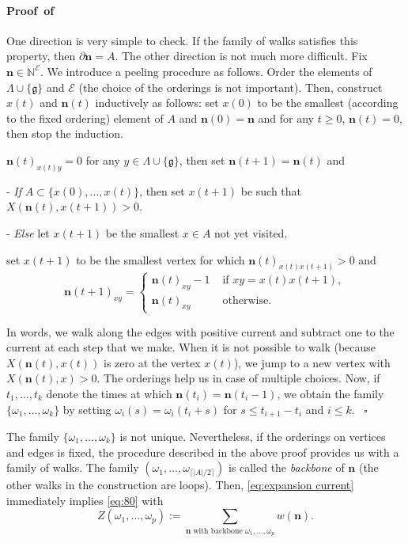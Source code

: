 \documentclass[a4paper,oneside,11pt]{article}
\newenvironment{proof}[1][\relax]%
  {\paragraph{Proof\ifx#1\relax\else~of #1\fi}}%
  {~\hfill$\square$\par\bigskip}
\newcommand{\ee}{\end{equation}}
\newcommand{\be}{\begin{equation}}
\begin{document}
\begin{proof}
One direction is very simple to check. If the family of walks satisfies this property, then $\partial \mathbf n=A$. The other direction is not much more difficult. Fix $\mathbf n\in \mathbb N^{\mathcal E}$. We introduce a peeling procedure as follows. Order the elements of $\Lambda\cup\{\mathfrak g\}$ and $\mathcal E$ (the choice of the orderings is not important). Then, construct $x(t)$ and $\mathbf n(t)$ inductively as follows: set $x(0)$ to be the smallest (according to the fixed ordering) element of $A$ and $\mathbf n(0)=\mathbf n$ and for any $t\ge0$,
\medbreak
{} $\mathbf n(t)=0$, then stop the induction.
 
  $\mathbf n(t)_{x(t)y}=0$ for any $y\in\Lambda\cup\{\mathfrak g\}$, then set $\mathbf n(t+1)=\mathbf n(t)$ and

- {\em If} $A\subset\{x(0),\dots,x(t)\}$, then set $x(t+1)$ be such that $X(\mathbf n(t),x(t+1))>0$.

- {\em Else} let $x(t+1)$ be the smallest $x\in A$ not yet visited.

 set $x(t+1)$ to be the smallest vertex for which $\mathbf n(t)_{x(t)x(t+1)}>0$ and 
$$\mathbf n(t+1)_{xy}=\begin{cases}\mathbf n(t)_{xy}-1&\text{ if }xy=x(t)x(t+1),\\
\mathbf n(t)_{xy}&\text{ otherwise}.\end{cases}$$

In words, we walk along the edges with positive current and subtract one to the current at each step that we make. When it is not possible to walk (because $X(\mathbf n(t),x(t))$ is zero at the vertex $x(t)$), we jump to a new vertex with $X(\mathbf n(t),x)>0$. The orderings help us  in case of multiple choices.  Now, if $t_1,\dots, t_k$ denote the times at which $\mathbf n(t_i)=\mathbf n(t_i-1)$, we obtain the family $\{\omega_1,\dots,\omega_k\}$ by setting $\omega_i(s)=\omega_i(t_i+s)$ for $s\le t_{i+1}-t_i$ and $i\le k$.
\end{proof}
The family $\{\omega_1,\dots,\omega_k\}$ is not unique. Nevertheless, if the orderings on vertices and edges is fixed, the procedure described in the above proof provides us with a family of walks. The family $(\omega_1,\dots,\omega_{\lceil |A|/2\rceil})$ is called the {\em backbone} of $\mathbf n$ (the other walks in the construction are loops). Then, \eqref{eq:expansion current} immediately implies \eqref{eq:80} with \be\nonumber
Z(\omega_1,\dots,\omega_p):=\sum_{\mathbf n\text{ with backbone }\omega_1,\dots,\omega_p}w(\mathbf n).\ee 
\end{document}
